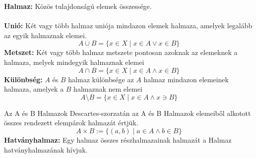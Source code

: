\documentclass[11pt,a4paper]{article}
\begin{document}
\begin{tcolorbox}[colback=green!5!white,colframe=green!60!black,title= 1. Halmaz{,} unió{,} metszet{,} különbség]
    \textbf{Halmaz:} Közös tulajdonságú elemek összessége.\\\\
    \textbf{Unió:} Két vagy több halmaz uniója mindazon elemek halmaza, amelyek legalább az egyik halmaznak elemei.
                $$A \cup  B = \{ x \in X\mid x \in A \vee  x \in B\}$$
    \textbf{Metszet:} Két vagy több halmaz metszete pontosan azoknak az elemeknek a halmaza, melyek mindegyik halmaznak elemei
                $$A \cap   B = \{ x \in X\mid x \in A \wedge x \in B\}$$
    \textbf{Különbség:} \(A\) és \(B\) halmaz különbsége az \(A\) halmaz mindazon elemeinek halmaza, amelyek a \(B\) halmaznak nem elemei
                $$A \setminus   B = \{ x \in X\mid x \in A \wedge x \ni B\}$$
    \begin{center}
    \end{center}
\end{tcolorbox}

\begin{tcolorbox}[colback=green!5!white,colframe=green!60!black,title= 2. Descartes-szorzat{,} hatványhalmaz]
    Az A és B Halmazok Descartes-szorzatán az A és B Halmazok elemeiből alkotott összes rendezett elempárok halmazát értjük.
    $$A \times B := \{(a,b)\mid a \in A \wedge b \in B\}$$
    \textbf{Hatványhalmaz:} Egy halmaz összes részhalmazainak halmazát a Halmaz hatványhalmazának hívjuk.
\end{tcolorbox}
\end{document}
